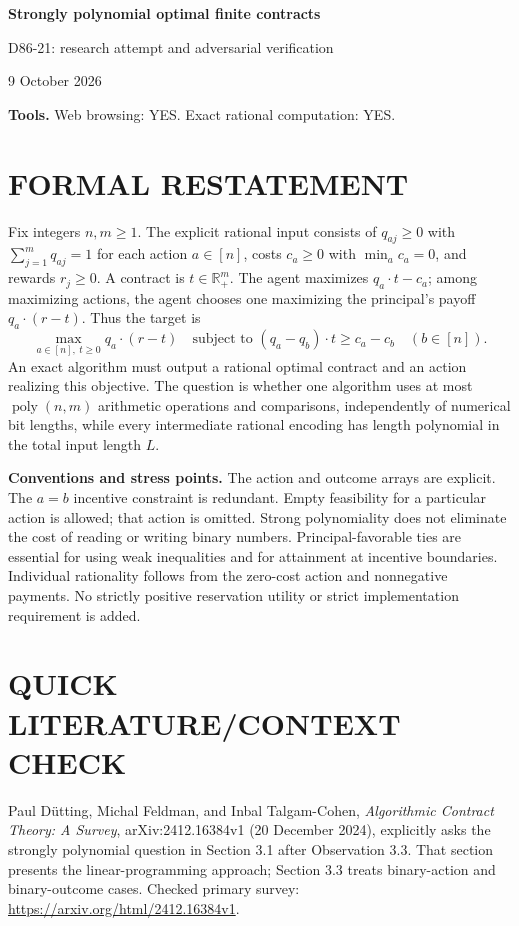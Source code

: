 \documentclass[11pt,a4paper]{article}
\theoremstyle{definition}\newtheorem{definition}[theorem]{Definition}
\theoremstyle{remark}\newtheorem{remark}[theorem]{Remark}
\newcommand{\R}{\mathbb R}\newcommand{\Q}{\mathbb Q}
\newcommand{\1}{\mathbf 1}
\begin{document}
\begin{center}
{\Large\bfseries Strongly polynomial optimal finite contracts}\par
\medskip
{\large D86-21: research attempt and adversarial verification}\par
9 October 2026
\end{center}
\textbf{Tools.} Web browsing: YES. Exact rational computation: YES.\par
\section{FORMAL RESTATEMENT}
Fix integers $n,m\ge1$. The explicit rational input consists of $q_{aj}\ge0$ with $\sum_{j=1}^m q_{aj}=1$ for each action $a\in[n]$, costs $c_a\ge0$ with $\min_a c_a=0$, and rewards $r_j\ge0$. A contract is $t\in\R_+^m$. The agent maximizes $q_a\cdot t-c_a$; among maximizing actions, the agent chooses one maximizing the principal's payoff $q_a\cdot(r-t)$. Thus the target is
\[
 \max_{a\in[n],\ t\ge0}q_a\cdot(r-t)
 \quad\text{subject to }(q_a-q_b)\cdot t\ge c_a-c_b\quad(b\in[n]).
\]
An exact algorithm must output a rational optimal contract and an action realizing this objective. The question is whether one algorithm uses at most $\operatorname{poly}(n,m)$ arithmetic operations and comparisons, independently of numerical bit lengths, while every intermediate rational encoding has length polynomial in the total input length $L$.

\textbf{Conventions and stress points.} The action and outcome arrays are explicit. The $a=b$ incentive constraint is redundant. Empty feasibility for a particular action is allowed; that action is omitted. Strong polynomiality does not eliminate the cost of reading or writing binary numbers. Principal-favorable ties are essential for using weak inequalities and for attainment at incentive boundaries. Individual rationality follows from the zero-cost action and nonnegative payments. No strictly positive reservation utility or strict implementation requirement is added.

\section{QUICK LITERATURE/CONTEXT CHECK}
Paul D\"utting, Michal Feldman, and Inbal Talgam-Cohen, \emph{Algorithmic Contract Theory: A Survey}, arXiv:2412.16384v1 (20 December 2024), explicitly asks the strongly polynomial question in Section 3.1 after Observation 3.3. That section presents the linear-programming approach; Section 3.3 treats binary-action and binary-outcome cases. Checked primary survey: \url{https://arxiv.org/html/2412.16384v1}.
\end{document}

